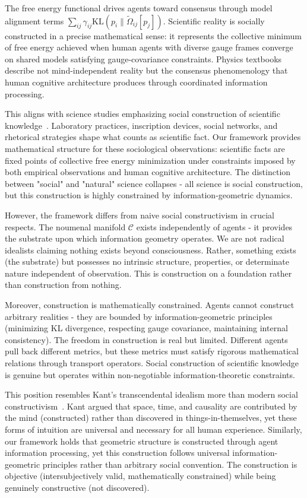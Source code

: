 \documentclass[11pt]{article}
\begin{document}
The free energy functional drives agents toward consensus through model alignment terms $\sum_{ij} \gamma_{ij} \mathrm{KL}(p_i \| \tilde{\Omega}_{ij}[p_j])$. Scientific reality is socially constructed in a precise mathematical sense: it represents the collective minimum of free energy achieved when human agents with diverse gauge frames converge on shared models satisfying gauge-covariance constraints. Physics textbooks describe not mind-independent reality but the consensus phenomenology that human cognitive architecture produces through coordinated information processing.

This aligns with science studies emphasizing social construction of scientific knowledge~\cite{Latour1979,Pickering1984}. Laboratory practices, inscription devices, social networks, and rhetorical strategies shape what counts as scientific fact. Our framework provides mathematical structure for these sociological observations: scientific facts are fixed points of collective free energy minimization under constraints imposed by both empirical observations and human cognitive architecture. The distinction between "social" and "natural" science collapses - all science is social construction, but this construction is highly constrained by information-geometric dynamics.

However, the framework differs from naive social constructivism in crucial respects. The noumenal manifold $\mathcal{C}$ exists independently of agents - it provides the substrate upon which information geometry operates. We are not radical idealists claiming nothing exists beyond consciousness. Rather, something exists (the substrate) but possesses no intrinsic structure, properties, or determinate nature independent of observation. This is construction on a foundation rather than construction from nothing.

Moreover, construction is mathematically constrained. Agents cannot construct arbitrary realities - they are bounded by information-geometric principles (minimizing KL divergence, respecting gauge covariance, maintaining internal consistency). The freedom in construction is real but limited. Different agents pull back different metrics, but these metrics must satisfy rigorous mathematical relations through transport operators. Social construction of scientific knowledge is genuine but operates within non-negotiable information-theoretic constraints.

This position resembles Kant's transcendental idealism more than modern social constructivism~\cite{Kant1781}. Kant argued that space, time, and causality are contributed by the mind (constructed) rather than discovered in things-in-themselves, yet these forms of intuition are universal and necessary for all human experience. Similarly, our framework holds that geometric structure is constructed through agent information processing, yet this construction follows universal information-geometric principles rather than arbitrary social convention. The construction is objective (intersubjectively valid, mathematically constrained) while being genuinely constructive (not discovered).
\end{document}
